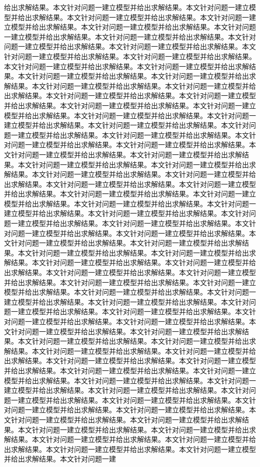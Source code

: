 给出求解结果。本文针对问题一建立模型并给出求解结果。本文针对问题一建立模型并给出求解结果。本文针对问题一建立模型并给出求解结果。本文针对问题一建立模型并给出求解结果。本文针对问题一建立模型并给出求解结果。本文针对问题一建立模型并给出求解结果。本文针对问题一建立模型并给出求解结果。本文针对问题一建立模型并给出求解结果。本文针对问题一建立模型并给出求解结果。本文针对问题一建立模型并给出求解结果。本文针对问题一建立模型并给出求解结果。本文针对问题一建立模型并给出求解结果。本文针对问题一建立模型并给出求解结果。本文针对问题一建立模型并给出求解结果。本文针对问题一建立模型并给出求解结果。本文针对问题一建立模型并给出求解结果。本文针对问题一建立模型并给出求解结果。本文针对问题一建立模型并给出求解结果。本文针对问题一建立模型并给出求解结果。本文针对问题一建立模型并给出求解结果。本文针对问题一建立模型并给出求解结果。本文针对问题一建立模型并给出求解结果。本文针对问题一建立模型并给出求解结果。本文针对问题一建立模型并给出求解结果。本文针对问题一建立模型并给出求解结果。本文针对问题一建立模型并给出求解结果。本文针对问题一建立模型并给出求解结果。本文针对问题一建立模型并给出求解结果。本文针对问题一建立模型并给出求解结果。本文针对问题一建立模型并给出求解结果。本文针对问题一建立模型并给出求解结果。本文针对问题一建立模型并给出求解结果。本文针对问题一建立模型并给出求解结果。本文针对问题一建立模型并给出求解结果。本文针对问题一建立模型并给出求解结果。本文针对问题一建立模型并给出求解结果。本文针对问题一建立模型并给出求解结果。本文针对问题一建立模型并给出求解结果。本文针对问题一建立模型并给出求解结果。本文针对问题一建立模型并给出求解结果。本文针对问题一建立模型并给出求解结果。本文针对问题一建立模型并给出求解结果。本文针对问题一建立模型并给出求解结果。本文针对问题一建立模型并给出求解结果。本文针对问题一建立模型并给出求解结果。本文针对问题一建立模型并给出求解结果。本文针对问题一建立模型并给出求解结果。本文针对问题一建立模型并给出求解结果。本文针对问题一建立模型并给出求解结果。本文针对问题一建立模型并给出求解结果。本文针对问题一建立模型并给出求解结果。本文针对问题一建立模型并给出求解结果。本文针对问题一建立模型并给出求解结果。本文针对问题一建立模型并给出求解结果。本文针对问题一建立模型并给出求解结果。本文针对问题一建立模型并给出求解结果。本文针对问题一建立模型并给出求解结果。本文针对问题一建立模型并给出求解结果。本文针对问题一建立模型并给出求解结果。本文针对问题一建立模型并给出求解结果。本文针对问题一建立模型并给出求解结果。本文针对问题一建立模型并给出求解结果。本文针对问题一建立模型并给出求解结果。本文针对问题一建立模型并给出求解结果。本文针对问题一建立模型并给出求解结果。本文针对问题一建立模型并给出求解结果。本文针对问题一建立模型并给出求解结果。本文针对问题一建立模型并给出求解结果。本文针对问题一建立模型并给出求解结果。本文针对问题一建立模型并给出求解结果。本文针对问题一建立模型并给出求解结果。本文针对问题一建立模型并给出求解结果。本文针对问题一建立模型并给出求解结果。本文针对问题一建立模型并给出求解结果。本文针对问题一建立模型并给出求解结果。本文针对问题一建立模型并给出求解结果。本文针对问题一建立模型并给出求解结果。本文针对问题一建立模型并给出求解结果。本文针对问题一建立模型并给出求解结果。本文针对问题一建立模型并给出求解结果。本文针对问题一建立模型并给出求解结果。本文针对问题一建立模型并给出求解结果。本文针对问题一建立模型并给出求解结果。本文针对问题一建立模型并给出求解结果。本文针对问题一建立模型并给出求解结果。本文针对问题一建立模型并给出求解结果。本文针对问题一建立模型并给出求解结果。本文针对问题一建